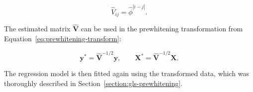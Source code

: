 \begin{equation}
    \widehat{V}_{ij} = \widehat{\phi}^{|i-j|}.
    \label{eq:estimated-ar1-covariance}
\end{equation}

The estimated matrix $\widehat{\mathbf{V}}$ can be used in the prewhitening transformation from Equation~\ref{eq:prewhitening-transform}:

\begin{equation}
    \mathbf{y}^{\ast} = \widehat{\mathbf{V}}^{-1/2}\mathbf{y}, \qquad \mathbf{X}^{\ast} = \widehat{\mathbf{V}}^{-1/2}\mathbf{X}.
\end{equation}

The regression model is then fitted again using the transformed data, which was thoroughly described in Section~\ref{section:gls-prewhitening}.